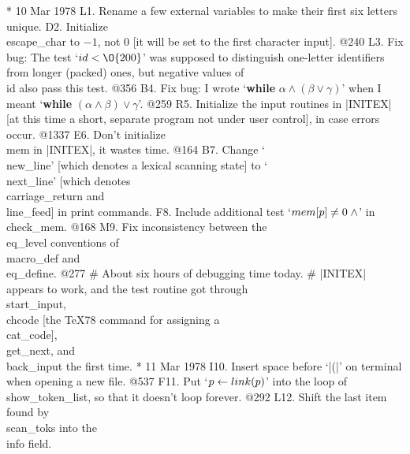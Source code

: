 
* 10 Mar 1978
L1. Rename a few external variables to make their first six letters unique.
D2. Initialize \\{escape_char} to $-1$, not 0 [it will be set to the
	first character input]. @240
L3. Fix bug: The test `$\\{id}<\O{200}$' was supposed to distinguish one-letter
	identifiers from longer (packed) ones, but negative values of
	\\{id} also pass this test. @356
B4. Fix bug: I wrote `{\bf while} $\alpha\land(\beta\lor\gamma)$' when I meant
	`{\bf while} $(\alpha\land\beta)\lor\gamma$'. @259
R5. Initialize the input routines in |INITEX| [at this time a short,
	separate program not under user control], in case errors occur. @1337
E6. Don't initialize \\{mem} in |INITEX|, it wastes time. @164
B7. Change `\\{new_line}' [which denotes a lexical scanning state] to
	`\\{next_line}' [which denotes
	\\{carriage_return} and \\{line_feed}] in print commands.
F8. Include additional test `$\\{mem}[p] \ne 0\; \land$' in \\{check_mem}. @168
M9. Fix inconsistency between the \\{eq_level} conventions of \\{macro_def} and
	\\{eq_define}. @277
# About six hours of debugging time today.
# |INITEX| appears to work,
	and the test routine got through \\{start_input},
	\\{chcode} [the \TeX78 command for assigning a \\{cat_code}],
	\\{get_next}, and \\{back_input} the first time.
* 11 Mar 1978
I10. Insert space before `|(|' on terminal when opening a new file. @537
F11. Put `$p\gets \\{link}(p)$' into the loop of \\{show_token_list},
	so that it doesn't loop forever. @292
L12. Shift the last item found by \\{scan_toks} into the \\{info} field.
